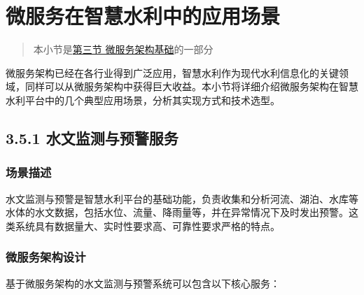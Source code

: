 \section{微服务在智慧水利中的应用场景}\label{ux5faeux670dux52a1ux5728ux667aux6167ux6c34ux5229ux4e2dux7684ux5e94ux7528ux573aux666f}

\begin{quote}
本小节是\href{section03-03.md}{第三节 微服务架构基础}的一部分
\end{quote}

微服务架构已经在各行业得到广泛应用，智慧水利作为现代水利信息化的关键领域，同样可以从微服务架构中获得巨大收益。本小节将详细介绍微服务架构在智慧水利平台中的几个典型应用场景，分析其实现方式和技术选型。

\subsection{3.5.1
水文监测与预警服务}\label{ux6c34ux6587ux76d1ux6d4bux4e0eux9884ux8b66ux670dux52a1}

\subsubsection{场景描述}\label{ux573aux666fux63cfux8ff0}

水文监测与预警是智慧水利平台的基础功能，负责收集和分析河流、湖泊、水库等水体的水文数据，包括水位、流量、降雨量等，并在异常情况下及时发出预警。这类系统具有数据量大、实时性要求高、可靠性要求严格的特点。

\subsubsection{微服务架构设计}\label{ux5faeux670dux52a1ux67b6ux6784ux8bbeux8ba1}

基于微服务架构的水文监测与预警系统可以包含以下核心服务：

